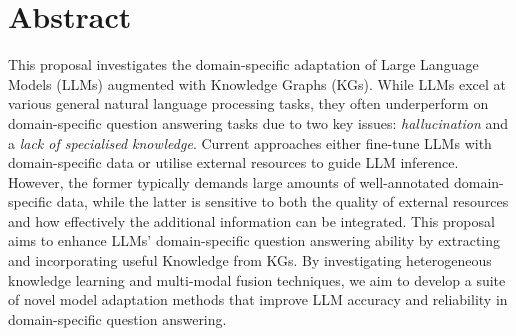 \section*{Abstract}
This proposal investigates the domain-specific adaptation of Large Language Models (LLMs) augmented with Knowledge Graphs (KGs). 
While LLMs excel at various general natural language processing tasks, they often underperform on domain-specific question answering tasks due to two key issues: \emph{hallucination} and a \emph{lack of specialised knowledge}. 
Current approaches either fine-tune LLMs with domain-specific data or utilise external resources to guide LLM inference. 
However, the former typically demands large amounts of well-annotated domain-specific data, while the latter is sensitive to both the quality of external resources and how effectively the additional information can be integrated. 
This proposal aims to enhance LLMs' domain-specific question answering ability by extracting and incorporating useful Knowledge from KGs. 
By investigating heterogeneous knowledge learning and multi-modal fusion techniques, we aim to develop a suite of novel model adaptation methods that improve LLM accuracy and reliability in domain-specific question answering. 
